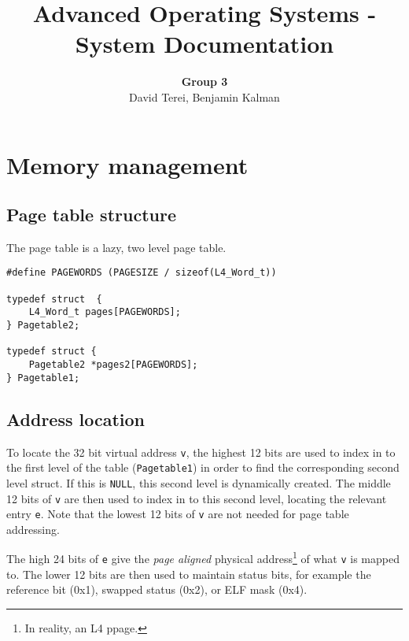 \documentclass[12pt,english]{article}
\begin{document}

\title{Advanced Operating Systems - System Documentation}
\author{\textbf{Group 3} \\ David Terei, Benjamin Kalman}
\maketitle

\tableofcontents{}


\newpage{}
\section{Memory management}

\subsection{Page table structure}

The page table is a lazy, two level page table.  

\begin{verbatim}
#define PAGEWORDS (PAGESIZE / sizeof(L4_Word_t))

typedef struct  {
    L4_Word_t pages[PAGEWORDS];
} Pagetable2;

typedef struct {
    Pagetable2 *pages2[PAGEWORDS];
} Pagetable1;
\end{verbatim}

\subsection{Address location}

To locate the 32 bit virtual address \texttt{v}, the highest 12 bits are used to index in to the first level of the table (\texttt{Pagetable1}) in order to find the corresponding second level struct.  If this is \texttt{NULL}, this second level is dynamically created.  The middle 12 bits of \texttt{v} are then used to index in to this second level, locating the relevant entry \texttt{e}.  Note that the lowest 12 bits of \texttt{v} are not needed for page table addressing.

The high 24 bits of \texttt{e} give the \emph{page aligned} physical address\footnote{In reality, an L4 ppage.} of what \texttt{v} is mapped to.  The lower 12 bits are then used to maintain status bits, for example the reference bit (0x1), swapped status (0x2), or ELF mask (0x4).
\end{document}
